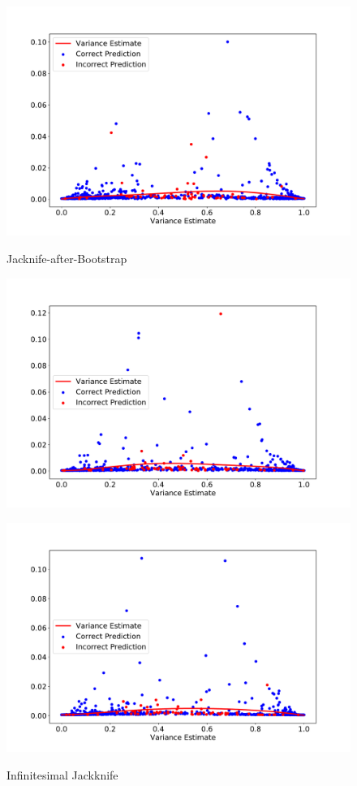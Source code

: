 \documentclass[11pt]{article}
\begin{document}
\begin{figure}[htbp]
	\centering
	\begin{minipage}{0.6\textwidth}
	\label{lab:figeure4_0}
	\includegraphics[width=1\textwidth]{../figures/figure4(1)0.pdf}
	\caption{Jacknife-after-Bootstrap}
	\end{minipage}
	\begin{minipage}{0.6\textwidth}
	\label{lab:figeure4_1}
	\centering	
	\includegraphics[width=1\textwidth]{../figures/figure4(1)1.pdf}
	\caption{Infinitesimal Jackknife}
	\end{minipage}
	\begin{minipage}{0.6\textwidth}
	\label{lab:figeure4_2}
	\centering	
	\includegraphics[width=1\textwidth]{../figures/figure4(1)2.pdf}

\end{minipage}
\end{figure}
\end{document}
